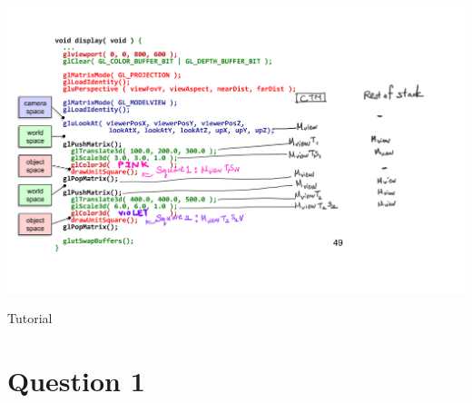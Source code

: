 \documentclass{beamer}
\begin{document}

\begin{frame}
    \centering
    \includegraphics[scale=0.4]{pg49-annot.png}
\end{frame}

\begin{frame}
    \AlegreyaExtraBold \LARGE
    Tutorial
\end{frame}

\section{Question 1}
\end{document}
